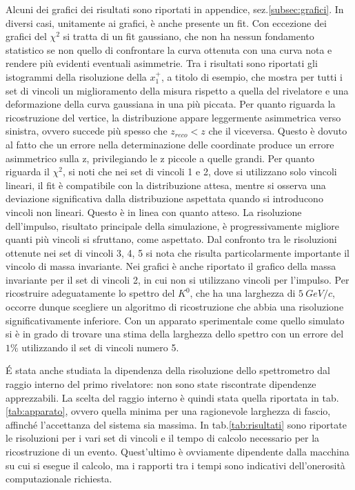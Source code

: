 \documentclass[8pt]{extarticle}
\begin{document}
Alcuni dei grafici dei risultati sono riportati in appendice, sez.\ref{subsec:grafici}. In diversi casi, unitamente ai grafici, è anche presente un fit. Con eccezione dei grafici del $\chi^2$ si tratta di un fit gaussiano, che non ha nessun fondamento statistico se non quello di confrontare la curva ottenuta con una curva nota e rendere più evidenti eventuali asimmetrie. Tra i risultati sono riportati gli istogrammi della risoluzione della $x_1^+$, a titolo di esempio, che mostra per tutti i set di vincoli un miglioramento della misura rispetto a quella del rivelatore e una deformazione della curva gaussiana in una più piccata. Per quanto riguarda la ricostruzione del vertice, la distribuzione appare leggermente asimmetrica verso sinistra, ovvero succede più spesso che $z_{reco} < z$ che il viceversa. Questo è dovuto al fatto che un errore nella determinazione delle coordinate produce un errore asimmetrico sulla z, privilegiando le z piccole a quelle grandi. Per quanto riguarda il $\chi^2$, si noti che nei set di vincoli 1 e 2, dove si utilizzano solo vincoli lineari, il fit è compatibile con la distribuzione attesa, mentre si osserva una deviazione significativa dalla distribuzione aspettata quando si introducono vincoli non lineari. Questo è in linea con quanto atteso. La risoluzione dell'impulso, risultato principale della simulazione, è progressivamente migliore quanti più vincoli si sfruttano, come aspettato. Dal confronto tra le risoluzioni ottenute nei set di vincoli 3, 4, 5 si nota che risulta particolarmente importante il vincolo di massa invariante. Nei grafici è anche riportato il grafico della massa invariante per il set di vincoli 2, in cui non si utilizzano vincoli per l'impulso. Per ricostruire adeguatamente lo spettro del $K^0$, che ha una larghezza di $5\ GeV/c$, occorre dunque scegliere un algoritmo di ricostruzione che abbia una risoluzione significativamente inferiore. Con un apparato sperimentale come quello simulato si è in grado di trovare una stima della larghezza dello spettro con un errore del $1\%$ utilizzando il set di vincoli numero 5.

\'E stata anche studiata la dipendenza della risoluzione dello spettrometro dal raggio interno del primo rivelatore: non sono state riscontrate dipendenze apprezzabili. La scelta del raggio interno è quindi stata quella riportata in tab.\ref{tab:apparato}, ovvero quella minima per una ragionevole larghezza di fascio, affinché l'accettanza del sistema sia massima. In tab.\ref{tab:risultati} sono riportate le risoluzioni per i vari set di vincoli e il tempo di calcolo necessario per la ricostruzione di un evento. Quest'ultimo è ovviamente dipendente dalla macchina su cui si esegue il calcolo, ma i rapporti tra i tempi sono indicativi dell'onerosità computazionale richiesta.
\end{document}
